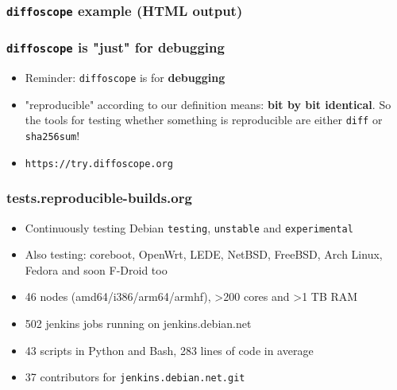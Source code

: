 \documentclass[14pt]{beamer}
\newif\ifplacelogo
\begin{document}
{\begin{frame}
 \frametitle{\texttt{diffoscope} example (HTML output)}
\end{frame}


\begin{frame}
 \frametitle{\texttt{diffoscope} is "just" for debugging}

 \begin{itemize}
  \item Reminder: \texttt{diffoscope} is for \textbf{debugging}
  \item "reproducible" according to our definition means: \textbf{bit by bit
  identical}. So the tools for testing whether something is reproducible are
  either \texttt{diff} or \texttt{sha256sum}!
  \item<2> \texttt{https://try.diffoscope.org}
 \end{itemize}
\end{frame}

}



\placelogotrue


\begin{frame}
 \frametitle{tests.reproducible-builds.org}

 \begin{itemize}
  \item Continuously testing Debian \texttt{testing}, \texttt{unstable} and
  \texttt{experimental}
  \item Also testing: coreboot, OpenWrt, LEDE, NetBSD, FreeBSD,
  Arch Linux, Fedora and soon F-Droid too
  \item 46 nodes (amd64/i386/arm64/armhf), >200 cores and >1 TB RAM
  \item 502 jenkins jobs running on jenkins.debian.net
  \item 43 scripts in Python and Bash, 283 lines of code in average
  \item 37 contributors for \texttt{jenkins.debian.net.git}
 \end{itemize}
\end{frame}
\end{document}
